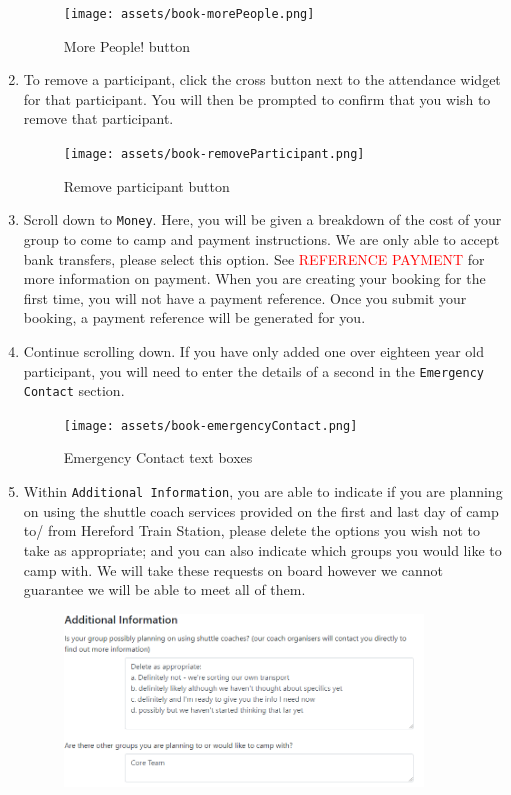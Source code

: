 \begin{enumerate}
    \begin{figure}[H]
        \centering
        \texttt{[image: assets/book-morePeople.png]}
        \caption{More People! button}
    \end{figure}
    \item To remove a participant, click the cross button next to the attendance widget for that participant. You will then be prompted to confirm that you wish to remove that participant.
    \begin{figure}[H]
        \centering
        \texttt{[image: assets/book-removeParticipant.png]}
        \caption{Remove participant button}
    \end{figure}
    \item Scroll down to \verb|Money|. Here, you will be given a breakdown of the cost of your group to come to camp and payment instructions. We are only able to accept bank transfers, please select this option. See \textcolor{red}{REFERENCE PAYMENT} for more information on payment. When you are creating your booking for the first time, you will not have a payment reference. Once you submit your booking, a payment reference will be generated for you. 
    \item Continue scrolling down. If you have only added one over eighteen year old participant, you will need to enter the details of a second in the \verb|Emergency Contact| section. 
    \begin{figure}[H]
        \centering
        \texttt{[image: assets/book-emergencyContact.png]}
        \caption{Emergency Contact text boxes}
    \end{figure}
    \item Within \verb|Additional Information|, you are able to indicate if you are planning on using the shuttle coach services provided on the first and last day of camp to/ from Hereford Train Station, please delete the options you wish not to take as appropriate; and you can also indicate which groups you would like to camp with. We will take these requests on board however we cannot guarantee we will be able to meet all of them.
    \begin{figure}[H]
        \centering
        \includegraphics[width=0.9\textwidth]{assets/book-additionalInfo.png}

\end{figure}
\end{enumerate}
